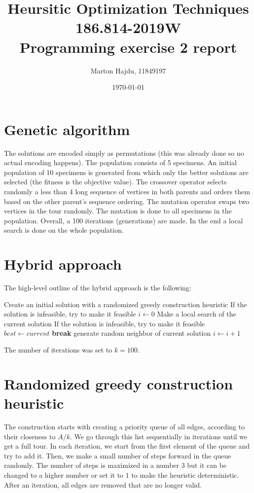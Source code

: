 \documentclass{article}
\title{Heursitic Optimization Techniques\\186.814-2019W\\Programming exercise 2 report}
\date{\today}
\author{Marton Hajdu, 11849197}
\begin{document}
\maketitle
\section*{Genetic algorithm}
The solutions are encoded simply as permutations (this was already done so no actual encoding happens). The population consists of 5 specimens. An initial population of 10 specimens is generated from which only the better solutions are selected (the fitness is the objective value). The crossover operator selects randomly a less than 4 long sequence of vertices in both parents and orders them based on the other parent's sequence ordering. The mutation operator swaps two vertices in the tour randomly. The mutation is done to all specimens in the population. Overall, a 100 iterations (generations) are made. In the end a local search is done on the whole population.
\section*{Hybrid approach}
The high-level outline of the hybrid approach is the following:
\begin{algorithmic}[1]
	\State Create an initial solution with a randomized greedy construction heuristic
	\State If the solution is infeasible, try to make it feasible
	\State $i \gets 0$
	\State Make a local search of the current solution
	\State If the solution is infeasible, try to make it feasible
	\State $best \gets current$
	\EndIf
	\State \textbf{break}
	\State generate random neighbor of current solution
	\State $i \gets i+1$
	\EndIf
	\EndWhile
\end{algorithmic}
The number of iterations was set to $k=100$.
\section*{Randomized greedy construction heuristic}
The construction starts with creating a priority queue of all edges, according to their closeness to $A/k$. We go through this list sequentially in iterations until we get a full tour. In each iteration, we start from the first element of the queue and try to add it. Then, we make a small number of steps forward in the queue randomly. The number of steps is maximized in a number $3$ but it can be changed to a higher number or set it to $1$ to make the heuristic deterministic. After an iteration, all edges are removed that are no longer valid.
\end{document}

